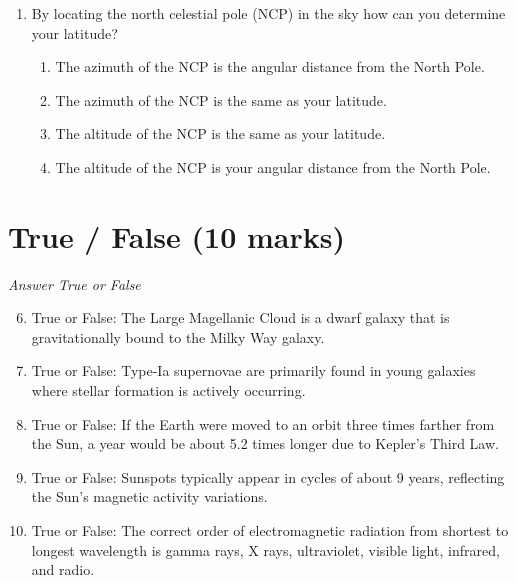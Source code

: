 \documentclass[12pt]{article}
\begin{document}
\begin{enumerate}[label=\arabic*.]
\begin{enumerate}[label=(\alph*)]
    \item The U.S.S.R.
    \item The U.S.
    \item France
    \item A and B
\end{enumerate}
\item By locating the north celestial pole (NCP) in the sky how can you determine your latitude?
\begin{enumerate}[label=(\alph*)]
    \item The azimuth of the NCP is the angular distance from the North Pole.
    \item The azimuth of the NCP is the same as your latitude.
    \item The altitude of the NCP is the same as your latitude.
    \item The altitude of the NCP is your angular distance from the North Pole.
\end{enumerate}
\end{enumerate}

\section*{True / False (10 marks)}
\textit{Answer True or False}
\begin{enumerate}[label=\arabic*.]
\setcounter{enumi}{5}
\item True or False: The Large Magellanic Cloud is a dwarf galaxy that is gravitationally bound to the Milky Way galaxy.
\item True or False: Type-Ia supernovae are primarily found in young galaxies where stellar formation is actively occurring.
\item True or False: If the Earth were moved to an orbit three times farther from the Sun, a year would be about 5.2 times longer due to Kepler's Third Law.
\item True or False: Sunspots typically appear in cycles of about 9 years, reflecting the Sun's magnetic activity variations.
\item True or False: The correct order of electromagnetic radiation from shortest to longest wavelength is gamma rays, X rays, ultraviolet, visible light, infrared, and radio.
\end{enumerate}
\end{document}
